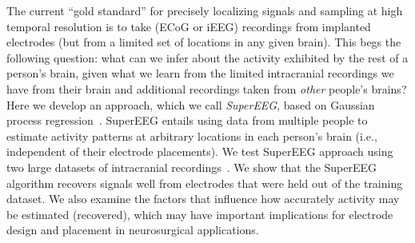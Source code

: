 \message{ !name(main.tex)}\documentclass[11pt]{article}
\begin{document}
The current ``gold standard'' for precisely localizing signals and
sampling at high temporal resolution is to take (ECoG or iEEG)
recordings from implanted electrodes (but from a limited set of
locations in any given brain).  This begs the following question: what
can we infer about the activity exhibited by the rest of a person's
brain, given what we learn from the limited intracranial recordings we
have from their brain and additional recordings taken from
\textit{other} people's brains?  Here we develop an approach, which we
call \textit{SuperEEG}, based on Gaussian process
regression~\cite{Rasm06}.  SuperEEG entails using data from multiple
people to estimate activity patterns at arbitrary locations in each
person's brain (i.e., independent of their electrode placements).  We
test SuperEEG approach using two large datasets of intracranial
recordings~\cite{SedeEtal03, SedeEtal07a, SedeEtal07b, MannEtal11,
  MannEtal12, EzzyEtal17, HoraEtal17, KragEtal17, KuceEtal17,
  LinEtal17, SoloEtal18, WeidEtal18, EzzyEtal18, KuceEtal18}.  We show
that the SuperEEG algorithm recovers signals well from electrodes that
were held out of the training dataset.  We also examine the factors
that influence how accurately activity may be estimated (recovered),
which may have important implications for electrode design and
placement in neurosurgical applications.
\end{document}
